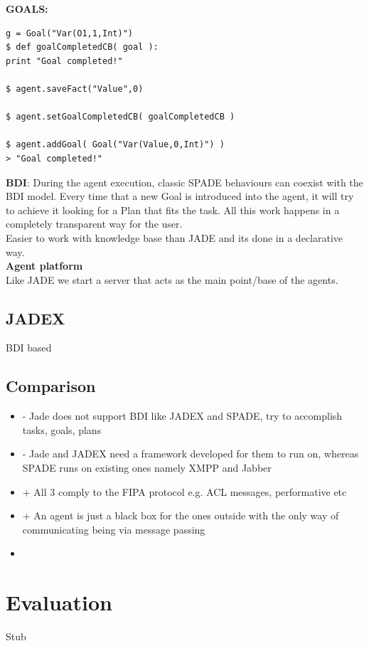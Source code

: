 \documentclass[a4paper, 11pt]{article}
\begin{document}
\textbf{GOALS:} \\
\begin{verbatim}
g = Goal("Var(O1,1,Int)")
$ def goalCompletedCB( goal ):
print "Goal completed!"

$ agent.saveFact("Value",0)

$ agent.setGoalCompletedCB( goalCompletedCB )

$ agent.addGoal( Goal("Var(Value,0,Int)") )
> "Goal completed!"
\end{verbatim}

\textbf{BDI}: During the agent execution, classic SPADE behaviours can coexist with the BDI model. Every time that a new Goal is introduced into the agent, it will try to achieve it looking for a Plan that fits the task. All this work happens in a completely transparent way for the user. \\
Easier to work with knowledge base than JADE and its done in a declarative way. \\

\textbf{Agent platform} \\
Like JADE we start a server that acts as the main point/base of the agents.

\subsection{JADEX}

BDI based \\


\subsection{Comparison}

\begin{itemize}
	\item - Jade does not support BDI like JADEX and SPADE, try to accomplish tasks, goals, plans
	\item - Jade and JADEX need a framework developed for them to run on, whereas SPADE runs on existing ones namely XMPP and Jabber
	\item + All 3 comply to the FIPA protocol e.g. ACL messages, performative etc
	\item + An agent is just a black box for the ones outside with the only way of communicating being via message passing
	\item 
\end{itemize}


\section{Evaluation}
Stub
\end{document}
